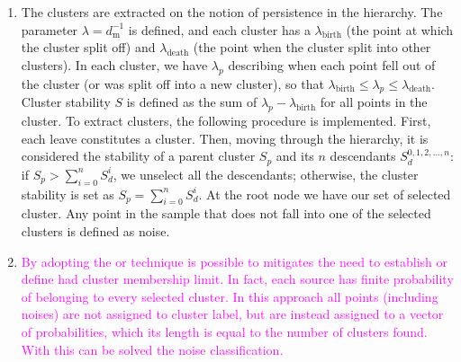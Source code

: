 \documentclass[fleqn,usenatbib]{mnras}
\newcommand{\rlopes}[1]{\textcolor{blue}{#1}}
\newcommand{\luis}[1]{\textcolor{magenta}{#1}}
\begin{document}
\begin{enumerate}
\item The clusters are extracted on the notion of persistence in the hierarchy.
  The parameter $\lambda = d_{\mathrm{m}}^{-1}$ is defined, and each cluster has a
  $\lambda_{\mathrm{birth}}$ (the point at which the cluster split off) and
  $\lambda_{\mathrm{death}}$ (the point when the cluster split into other clusters).
  In each cluster, we have $\lambda_p$ describing when each point fell out of the
  cluster (or was split off into a new cluster), so that $\lambda_{\mathrm{birth}} \leq \lambda_{p} \leq \lambda_{\mathrm{death}}$.
  Cluster stability $S$ is defined as the sum of $\lambda_{p} - \lambda_{\mathrm{birth}}$
  for all points in the cluster. To extract clusters, the following procedure is
  implemented. First, %
  each leave constitutes a cluster. Then, moving through the
  hierarchy, it is considered the stability of a parent cluster $S_p$ and its $n$ descendants
  $S_d^{0,1,2,...,n}$: if $S_p > \sum_{i=0}^{n} S_d^i$, we unselect all the descendants; otherwise,
  the cluster stability is set as 
  $S_p = \sum_{i=0}^{n} S_d^i$. At the root node we have our set of selected 
  cluster. Any point in the sample that does not fall into one of the selected
  clusters is defined as noise.

  
  \item \luis{By adopting the  or \texbf{fuzzy clustering} technique is possible to
  mitigates the need to establish or define had cluster membership limit. In fact, each source
  has finite probability of belonging to every selected cluster. In this approach all points 
  (including noises) are not assigned to cluster label, but are instead assigned to a vector of probabilities, which its length is equal to the number of clusters found. With this can be solved the noise classification.}
\end{enumerate}
\end{document}
